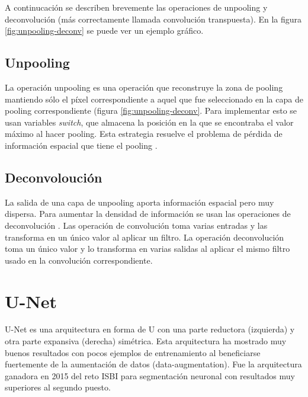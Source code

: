 
A continucación se describen brevemente las operaciones de unpooling y deconvolución (más correctamente llamada convolución transpuesta). En la figura \ref{fig:unpooling-deconv} \cite{Noh2015} se puede ver un ejemplo gráfico.

\subsection{Unpooling}

La operación unpooling es una operación que reconstruye la zona de pooling mantiendo sólo el píxel correspondiente a aquel que fue seleccionado en la capa de pooling correspondiente (figura \ref{fig:unpooling-deconv}. Para implementar esto se usan variables \textit{switch}, que almacena la posición en la que se encontraba el valor máximo al hacer pooling. Esta estrategia resuelve el problema de pérdida de información espacial que tiene el pooling \cite{Zeiler2011}.

\subsection{Deconvoloución}

La salida de una capa de unpooling aporta información espacial pero muy dispersa. Para aumentar la densidad de información se usan las operaciones de deconvolución \cite{Noh2015}. Las operación de convolución toma varias entradas y las transforma en un único valor al aplicar un filtro. La operación deconvolución toma un único valor y lo transforma en varias salidas al aplicar el mismo filtro usado en la convolución correspondiente.


\section{U-Net}

U-Net es una arquitectura en forma de U con una parte reductora (izquierda) y otra parte expansiva (derecha) simétrica. Esta arquitectura ha mostrado muy buenos resultados con pocos ejemplos de entrenamiento al beneficiarse fuertemente de la aumentación de datos (data-augmentation)\cite{Ronneberger2015}. Fue la arquitectura ganadora en 2015 del reto ISBI para segmentación neuronal con resultados muy superiores al segundo puesto. 


